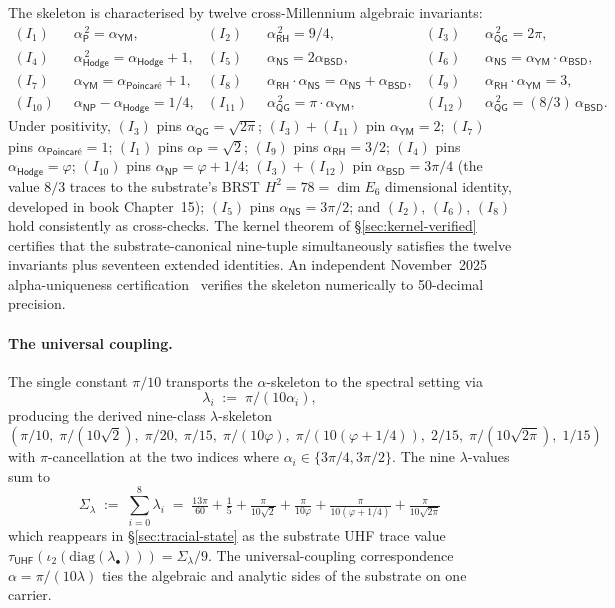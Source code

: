 \documentclass[11pt,a4paper]{amsart}
\theoremstyle{plain}
\theoremstyle{definition}
\begin{document}
The skeleton is characterised by twelve cross-Millennium algebraic invariants:
\begin{align*}
(I_1)\;\; & \alpha_{\textsf{P}}^{\,2} = \alpha_{\textsf{YM}}, &
(I_2)\;\; & \alpha_{\textsf{RH}}^{\,2} = 9/4, &
(I_3)\;\; & \alpha_{\textsf{QG}}^{\,2} = 2\pi, \\
(I_4)\;\; & \alpha_{\textsf{Hodge}}^{\,2} = \alpha_{\textsf{Hodge}} + 1, &
(I_5)\;\; & \alpha_{\textsf{NS}} = 2\alpha_{\textsf{BSD}}, &
(I_6)\;\; & \alpha_{\textsf{NS}} = \alpha_{\textsf{YM}} \cdot \alpha_{\textsf{BSD}}, \\
(I_7)\;\; & \alpha_{\textsf{YM}} = \alpha_{\textsf{Poincar\'e}} + 1, &
(I_8)\;\; & \alpha_{\textsf{RH}} \cdot \alpha_{\textsf{NS}} = \alpha_{\textsf{NS}} + \alpha_{\textsf{BSD}}, &
(I_9)\;\; & \alpha_{\textsf{RH}} \cdot \alpha_{\textsf{YM}} = 3, \\
(I_{10})\;\; & \alpha_{\textsf{NP}} - \alpha_{\textsf{Hodge}} = 1/4, &
(I_{11})\;\; & \alpha_{\textsf{QG}}^{\,2} = \pi \cdot \alpha_{\textsf{YM}}, &
(I_{12})\;\; & \alpha_{\textsf{QG}}^{\,2} = (8/3)\,\alpha_{\textsf{BSD}}.
\end{align*}
Under positivity, $(I_3)$ pins $\alpha_{\textsf{QG}} = \sqrt{2\pi}$; $(I_3) + (I_{11})$ pin $\alpha_{\textsf{YM}} = 2$; $(I_7)$ pins $\alpha_{\textsf{Poincar\'e}} = 1$; $(I_1)$ pins $\alpha_{\textsf{P}} = \sqrt{2}$; $(I_9)$ pins $\alpha_{\textsf{RH}} = 3/2$; $(I_4)$ pins $\alpha_{\textsf{Hodge}} = \varphi$; $(I_{10})$ pins $\alpha_{\textsf{NP}} = \varphi + 1/4$; $(I_3) + (I_{12})$ pin $\alpha_{\textsf{BSD}} = 3\pi/4$ (the value $8/3$ traces to the substrate's BRST $H^2 = 78 = \dim E_6$ dimensional identity, developed in book Chapter~15); $(I_5)$ pins $\alpha_{\textsf{NS}} = 3\pi/2$; and $(I_2)$, $(I_6)$, $(I_8)$ hold consistently as cross-checks. The kernel theorem of \S\ref{sec:kernel-verified} certifies that the substrate-canonical nine-tuple simultaneously satisfies the twelve invariants plus seventeen extended identities. An independent November~2025 alpha-uniqueness certification~\cite{cohen2025alphaUniqueness} verifies the skeleton numerically to 50-decimal precision.

\paragraph{The universal coupling.} The single constant $\pi/10$ transports the $\alpha$-skeleton to the spectral setting via
\[
\lambda_i \;:=\; \pi / (10 \alpha_i),
\]
producing the derived nine-class $\lambda$-skeleton
\[
(\pi/10,\; \pi/(10\sqrt{2}),\; \pi/20,\; \pi/15,\; \pi/(10\varphi),\; \pi/(10(\varphi+1/4)),\; 2/15,\; \pi/(10\sqrt{2\pi}),\; 1/15)
\]
with $\pi$-cancellation at the two indices where $\alpha_i \in \{3\pi/4, 3\pi/2\}$. The nine $\lambda$-values sum to
\[
\Sigma_\lambda \;:=\; \sum_{i=0}^{8} \lambda_i \;=\; \tfrac{13\pi}{60} + \tfrac{1}{5} + \tfrac{\pi}{10\sqrt{2}} + \tfrac{\pi}{10\varphi} + \tfrac{\pi}{10(\varphi+1/4)} + \tfrac{\pi}{10\sqrt{2\pi}}
\]
which reappears in \S\ref{sec:tracial-state} as the substrate UHF trace value $\tau_{\textsf{UHF}}(\iota_2(\mathrm{diag}(\lambda_\bullet))) = \Sigma_\lambda / 9$. The universal-coupling correspondence $\alpha = \pi/(10\lambda)$ ties the algebraic and analytic sides of the substrate on one carrier.
\end{document}
